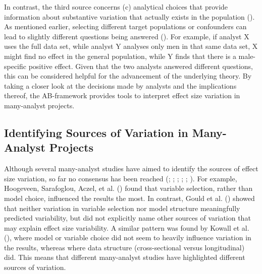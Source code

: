 \documentclass[
  man,
  floatsintext,
  longtable,
  nolmodern,
  notxfonts,
  notimes,
  colorlinks=true,linkcolor=blue,citecolor=blue,urlcolor=blue]{apa7}
\begin{document}
In contrast, the third source concerns (c) analytical choices that
provide information about substantive variation that actually exists in
the population (). As mentioned earlier, selecting different target populations or
confounders can lead to slightly different questions being answered
().
For example, if analyst X uses the full data set, while analyst Y
analyses only men in that same data set, X might find no effect in the
general population, while Y finds that there is a male-specific positive
effect. Given that the two analysts answered different questions, this
can be considered helpful for the advancement of the underlying theory.
By taking a closer look at the decisions made by analysts and the
implications thereof, the AB-framework provides tools to interpret
effect size variation in many-analyst projects.

\subsection{Identifying Sources of Variation in Many-Analyst
Projects}\label{identifying-sources-of-variation-in-many-analyst-projects}

Although several many-analyst studies have aimed to identify the sources
of effect size variation, so far no consensus has been reached
(;
;
;
; ; ).
For example, Hoogeveen, Sarafoglou, Aczel, et al.
() found that variable
selection, rather than model choice, influenced the results the most. In
contrast, Gould et al. () showed
that neither variation in variable selection nor model structure
meaningfully predicted variability, but did not explicitly name other
sources of variation that may explain effect size variability. A similar
pattern was found by Kowall et al.
(), where model or variable
choice did not seem to heavily influence variation in the results,
whereas where data structure (cross-sectional versus longitudinal) did.
This means that different many-analyst studies have highlighted
different sources of variation.
\end{document}
